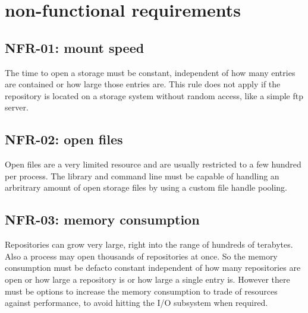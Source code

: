 \documentclass[9pt,pagesize,DIV12,normalheadings,BCOR5mm,headexclude,footexclude]{scrbook}
\begin{document}
\section{non-functional requirements}

\subsection{NFR-01: mount speed}
The time to open a storage must be constant, independent of how many entries
are contained or how large those entries are. This rule does not apply
if the repository is located on a storage system without random access,
like a simple ftp server.

\subsection{NFR-02: open files}
Open files are a very limited resource and are usually restricted to a few
hundred per process. The library and command line must be capable of handling
an arbritrary amount of open storage files by using a custom file handle 
pooling.

\subsection{NFR-03: memory consumption}
Repositories can grow very large, right into the range of hundreds of terabytes.
Also a process may open thousands of repositories at once. So the memory
consumption must be defacto constant independent of how many repositories are
open or how large a repository is or how large a single entry is. However 
there must be options to increase the memory consumption to trade of resources
against performance, to avoid hitting the I/O subsystem when required.
\end{document}
